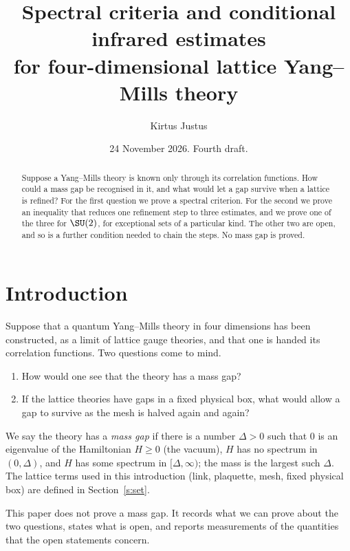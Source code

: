 
\usepackage{tikz}
\usetikzlibrary{positioning,arrows.meta}
\title[Spectral criteria and conditional infrared estimates]{Spectral criteria and conditional infrared estimates\\ for four-dimensional lattice Yang--Mills theory}
\author{Kirtus Justus}
\address{Theoretical Physicist, Port Coquitlam, British Columbia, Canada}
\date{24 November 2026. Fourth draft.}

\begin{abstract}
Suppose a Yang--Mills theory is known only through its correlation functions. How could a mass gap be
recognised in it, and what would let a gap survive when a lattice is refined? For the first question we prove
a spectral criterion. For the second we prove an inequality that reduces one refinement step to three
estimates, and we prove one of the three for $\SU(2)$, for exceptional sets of a particular kind. The other two are open, and so is a further condition
needed to chain the steps. No mass gap is proved.
\end{abstract}
\maketitle
\tableofcontents

\section{Introduction}\label{s:intro}

Suppose that a quantum Yang--Mills theory in four dimensions has been constructed, as a limit of lattice
gauge theories, and that one is handed its correlation functions. Two questions come to mind.
\begin{enumerate}
\item How would one see that the theory has a mass gap?
\item If the lattice theories have gaps in a fixed physical box, what would allow a gap to survive as the
mesh is halved again and again?
\end{enumerate}
We say the theory has a \emph{mass gap} if there is a number $\Delta>0$ such that $0$ is an eigenvalue of the
Hamiltonian $H\ge0$ (the vacuum), $H$ has no spectrum in $(0,\Delta)$, and $H$ has some spectrum in
$[\Delta,\infty)$; the mass is the largest such $\Delta$. The lattice terms used in this introduction (link, plaquette,
mesh, fixed physical box) are defined in Section~\ref{s:set}.

This paper does not prove a mass gap. It records what we can prove about the two questions, states what is
open, and reports measurements of the quantities that the open statements concern.

